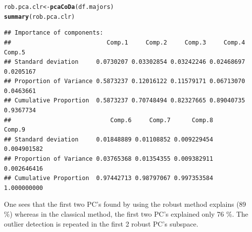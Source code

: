 \documentclass[a4paper,oneside,12pt,titlepage]{article}\usepackage[]{graphicx}\usepackage[]{color}
\makeatletter
\newcommand{\hlstd}[1]{\textcolor[rgb]{0.345,0.345,0.345}{#1}}%
\newcommand{\hlkwb}[1]{\textcolor[rgb]{0.69,0.353,0.396}{#1}}%
\newcommand{\hlkwd}[1]{\textcolor[rgb]{0.737,0.353,0.396}{\textbf{#1}}}%
\newenvironment{kframe}{%
 \def\at@end@of@kframe{}%
 \ifinner\ifhmode%
  \def\at@end@of@kframe{\end{minipage}}%
  \begin{minipage}{\columnwidth}%
 \fi\fi%
 \def\FrameCommand##1{\hskip\@totalleftmargin \hskip-\fboxsep
 \colorbox{shadecolor}{##1}\hskip-\fboxsep
     \hskip-\linewidth \hskip-\@totalleftmargin \hskip\columnwidth}%
 \MakeFramed {\advance\hsize-\width
   \@totalleftmargin\z@ \linewidth\hsize
   \@setminipage}}%
 {\par\unskip\endMakeFramed%
 \at@end@of@kframe}
\newenvironment{knitrout}{}{} %
\makeatother
\begin{document}
\begin{knitrout}
\color{fgcolor}\begin{kframe}
\begin{alltt}
\hlstd{rob.pca.clr} \hlkwb{<-} \hlkwd{pcaCoDa}\hlstd{(df.majors)}
\hlkwd{summary}\hlstd{(rob.pca.clr)}
\end{alltt}
\begin{verbatim}
## Importance of components:
##                           Comp.1     Comp.2     Comp.3     Comp.4    Comp.5
## Standard deviation     0.0730207 0.03302854 0.03242246 0.02468697 0.0205167
## Proportion of Variance 0.5873237 0.12016122 0.11579171 0.06713070 0.0463661
## Cumulative Proportion  0.5873237 0.70748494 0.82327665 0.89040735 0.9367734
##                            Comp.6     Comp.7      Comp.8      Comp.9
## Standard deviation     0.01848889 0.01108852 0.009229454 0.004901582
## Proportion of Variance 0.03765368 0.01354355 0.009382911 0.002646416
## Cumulative Proportion  0.97442713 0.98797067 0.997353584 1.000000000
\end{verbatim}
\end{kframe}
\end{knitrout}
One sees that the first two PC's found by using the robust method explains (89 \%) whereas in the classical method, the first two PC's explained only 76 \%. The outlier detection is repeated in the first 2 robust PC's subspace.
\end{document}
